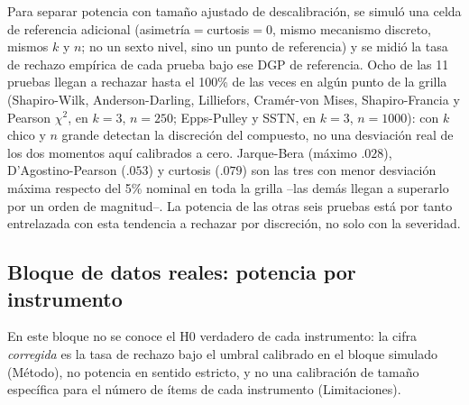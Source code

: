 \documentclass[man,mask,donotrepeattitle,floatsintext]{apa7}
\begin{document}
Para separar potencia con tamaño ajustado de descalibración, se simuló una celda de referencia adicional (asimetría$=$curtosis$=0$, mismo mecanismo discreto, mismos $k$ y $n$; no un sexto nivel, sino un punto de referencia) y se midió la tasa de rechazo empírica de cada prueba bajo ese DGP de referencia. Ocho de las 11 pruebas llegan a rechazar hasta el 100\% de las veces en algún punto de la grilla (Shapiro-Wilk, Anderson-Darling, Lilliefors, Cramér-von Mises, Shapiro-Francia y Pearson $\chi^2$, en $k=3$, $n=250$; Epps-Pulley y SSTN, en $k=3$, $n=1000$): con $k$ chico y $n$ grande detectan la discreción del compuesto, no una desviación real de los dos momentos aquí calibrados a cero. Jarque-Bera (máximo $.028$), D'Agostino-Pearson ($.053$) y curtosis ($.079$) son las tres con menor desviación máxima respecto del 5\% nominal en toda la grilla --las demás llegan a superarlo por un orden de magnitud--. La potencia de las otras seis pruebas está por tanto entrelazada con esta tendencia a rechazar por discreción, no solo con la severidad.

\subsection{Bloque de datos reales: potencia por instrumento}
\label{sec:res-real}

En este bloque no se conoce el H0 verdadero de cada instrumento: la cifra \emph{corregida} es la tasa de rechazo bajo el umbral calibrado en el bloque simulado (Método), no potencia en sentido estricto, y no una calibración de tamaño específica para el número de ítems de cada instrumento (Limitaciones).
\end{document}
